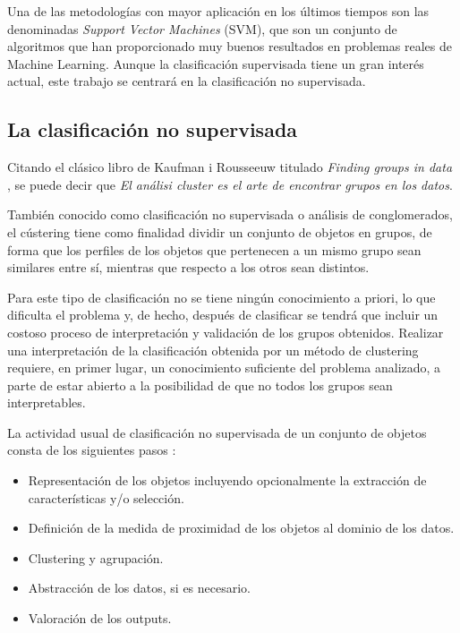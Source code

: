 \documentclass{article}
\begin{document}
Una de las metodologías con mayor aplicación en los últimos tiempos son las denominadas \emph{Support Vector Machines} (SVM), que son un conjunto de algoritmos que han proporcionado muy buenos resultados en problemas reales de Machine Learning. Aunque la clasificación supervisada tiene un gran interés actual, este trabajo se centrará en la clasificación no supervisada.



\subsection*{La clasificación no supervisada}

Citando el clásico libro de Kaufman i Rousseeuw titulado \emph{Finding groups in data} \cite{fgd}, se puede decir que \emph{El análisi cluster es el arte de encontrar grupos en los datos}.

También conocido como clasificación no supervisada o análisis de conglomerados, el cústering tiene como finalidad dividir un conjunto de objetos en grupos, de forma que los perfiles de los objetos que pertenecen a un mismo grupo sean similares entre sí, mientras que respecto a los otros sean distintos.

Para este tipo de clasificación no se tiene ningún conocimiento a priori, lo que dificulta el problema y, de hecho, después de clasificar se tendrá que incluir un costoso proceso de interpretación y validación de los grupos obtenidos. Realizar una interpretación de la clasificación obtenida por un método de clustering requiere, en primer lugar, un conocimiento suficiente del problema analizado, a parte de estar abierto a la posibilidad de que no todos los grupos sean interpretables.

La actividad usual de clasificación no supervisada de un conjunto de objetos consta de los siguientes pasos \cite{jandub88}:

\begin{itemize}
\item Representación de los objetos incluyendo opcionalmente la extracción de características y/o selección.
\item Definición de la medida de proximidad de los objetos al dominio de los datos.
\item Clustering y agrupación.
\item Abstracción de los datos, si es necesario.
\item Valoración de los outputs.
\end{itemize}
\end{document}

